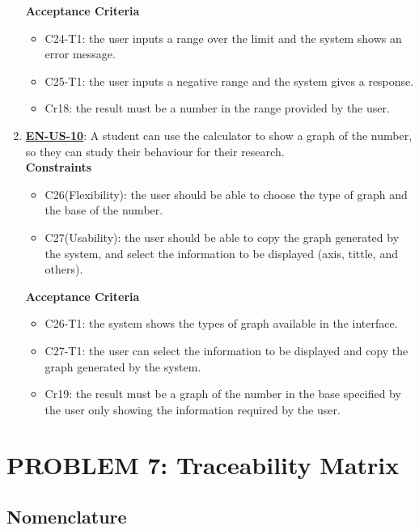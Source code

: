 \documentclass{report}
\begin{document}
\begin{enumerate}
\textbf{Acceptance Criteria}
\begin{itemize}
    \item C24-T1: the user inputs a range over the limit and the system shows an error message.
    \item C25-T1: the user inputs a negative range and the system gives a response.

    \item Cr18: the result must be a number in the range provided by the user. \newline
\end{itemize}

\item \underline{\textbf{EN-US-10}}: A student can use the calculator to show a graph of the number, so they can study their behaviour for their research. \\ \newline
\textbf{Constraints}
\begin{itemize}
    \item C26(Flexibility): the user should be able to choose the type of graph and the base of the number.
    \item C27(Usability): the user should be able to copy the graph generated by the system, and select the information to be displayed (axis, tittle, and others).\\
\end{itemize}

\textbf{Acceptance Criteria}
\begin{itemize}
    \item C26-T1: the system shows the types of graph available in the interface.
    \item C27-T1: the user can select the information to be displayed and copy the graph generated by the system.

    \item Cr19: the result must be a graph of the number in the base specified by the user only showing the information required by the user. \newline
\end{itemize}
\end{enumerate}
\section{PROBLEM 7: Traceability Matrix }

\subsection{Nomenclature}
\end{document}
